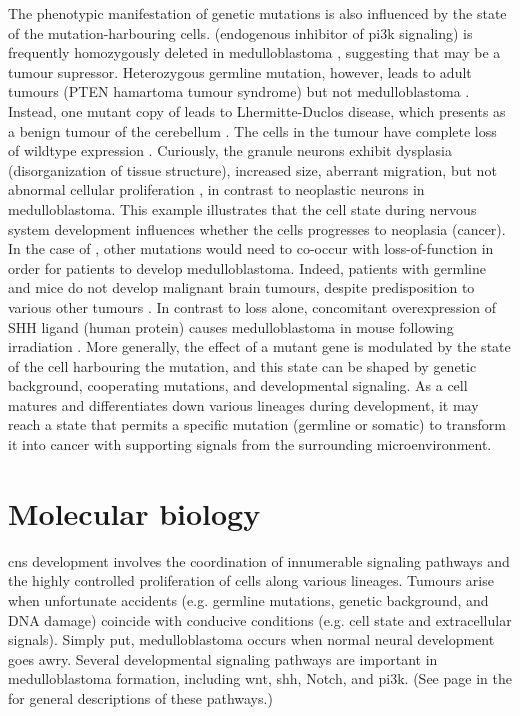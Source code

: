 The phenotypic manifestation of genetic mutations is also influenced by the state of the mutation-harbouring cells.  (endogenous inhibitor of \gls{pi3k} signaling) is frequently homozygously deleted in medulloblastoma , suggesting that  may be a tumour supressor. Heterozygous germline  mutation, however, leads to adult tumours (PTEN hamartoma tumour syndrome) but not medulloblastoma . Instead, one mutant copy of  leads to Lhermitte-Duclos disease, which presents as a benign tumour of the cerebellum . The cells in the tumour have complete loss of wildtype  expression . Curiously, the granule neurons exhibit dysplasia (disorganization of tissue structure), increased size, aberrant migration, but not abnormal cellular proliferation , in contrast to neoplastic neurons in medulloblastoma. This example illustrates that the cell state during nervous system development influences whether the cells progresses to neoplasia (cancer). In the case of , other mutations would need to co-occur with  loss-of-function in order for patients to develop medulloblastoma. Indeed, patients with germline  and \high{+/-} mice do not develop malignant brain tumours, despite predisposition to various other tumours . In contrast to  loss alone, concomitant overexpression of SHH ligand (human protein) causes medulloblastoma in mouse following irradiation . More generally, the effect of a mutant gene is modulated by the state of the cell harbouring the mutation, and this state can be shaped by genetic background, cooperating mutations, and developmental signaling. As a cell matures and differentiates down various lineages during development, it may reach a state that permits a specific mutation (germline or somatic) to transform it into cancer with supporting signals from the surrounding microenvironment.


\section{Molecular biology}

\gls{cns} development involves the coordination of innumerable signaling pathways and the highly controlled proliferation of cells along various lineages. Tumours arise when unfortunate accidents (e.g. germline mutations, genetic background, and DNA damage) coincide with conducive conditions (e.g. cell state and extracellular signals). Simply put, medulloblastoma occurs when normal neural development goes awry. Several developmental signaling pathways are important in medulloblastoma formation, including \gls{wnt}, \gls{shh}, Notch, and \gls{pi3k}. (See page \pageref{sec:signal-pathways} in the  for general descriptions of these pathways.)

